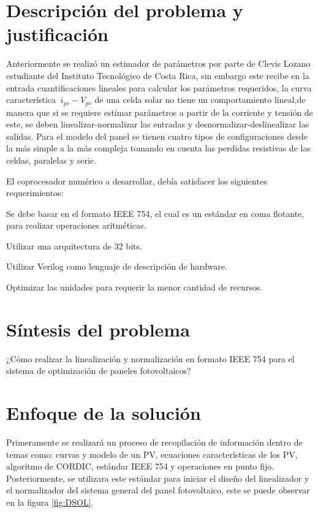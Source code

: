 \section{Descripción del problema y justificación}

Anteriormente se realizó un estimador de parámetros por parte de Clevis Lozano estudiante del Instituto Tecnológico de Costa Rica, sin embargo este recibe en la entrada cuantificaciones lineales para calcular los parámetros requeridos, la curva característica $\ i_{pv}-V_{pv}$ de una celda solar no tiene un comportamiento lineal,de manera que si se requiere estimar parámetros a partir de la corriente y tensión de este, se deben linealizar-normalizar las entradas y desnormalizar-deslinealizar las salidas. 
Para el modelo del panel se tienen cuatro tipos de configuraciones desde la más simple a la más compleja tomando en cuenta las perdidas resistivas de las celdas, paralelas y serie.  

El coprocesador numérico a desarrollar, debía satisfacer los siguientes requerimientos:

\begin{compactitem}
\item Se debe basar en el formato IEEE 754, el cual es un estándar en coma flotante, para realizar operaciones aritméticas.
\item Utilizar una arquitectura de 32 bits.
\item Utilizar Verilog como lenguaje de descripción de hardware.
\item Optimizar las unidades para requerir la menor cantidad de recursos.
\end{compactitem}

\section{Síntesis del problema}

¿Cómo realizar la linealización y normalización en formato IEEE 754 para el sistema de optimización de paneles fotovoltaicos?

\section{Enfoque de la solución}

Primeramente se realizará un proceso de recopilación de información dentro de temas como: curvas y modelo de un PV, ecuaciones características de los PV, algoritmo de CORDIC, estándar IEEE 754 y operaciones en punto fijo. Posteriormente, se utilizara este estándar para iniciar el diseño del linealizador y el normalizador del sistema general del panel fotovoltaico, este se puede observar en la figura \ref{fig:DSOL}. 

